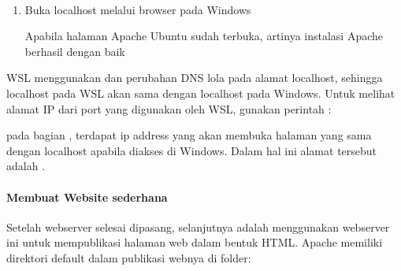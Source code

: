 \documentclass[letterpaper,10pt,english]{sphinxmanual}
\begin{document}
 
\begin{enumerate}
%
\item {} 
Buka localhost melalui browser pada Windows


Apabila halaman Apache Ubuntu sudah terbuka, artinya instalasi Apache berhasil dengan baik

\end{enumerate}

WSL menggunakan  dan perubahan DNS lola pada alamat localhost, sehingga localhost pada WSL akan sama dengan localhost pada Windows. Untuk melihat alamat IP dari port yang digunakan oleh WSL, gunakan perintah :


pada bagian , terdapat ip address yang akan membuka halaman yang sama dengan localhost apabila diakses di Windows. Dalam hal ini alamat tersebut adalah .


\paragraph{Membuat Website sederhana}
\label{\detokenize{sesi1/linuxserver:membuat-website-sederhana}}
Setelah webserver selesai dipasang, selanjutnya adalah menggunakan webserver ini untuk mempublikasi halaman web dalam bentuk HTML. Apache memiliki direktori default dalam publikasi webnya di folder:

\begin{sphinxVerbatim}[commandchars=\\\{\}]
\end{sphinxVerbatim}
\end{document}
